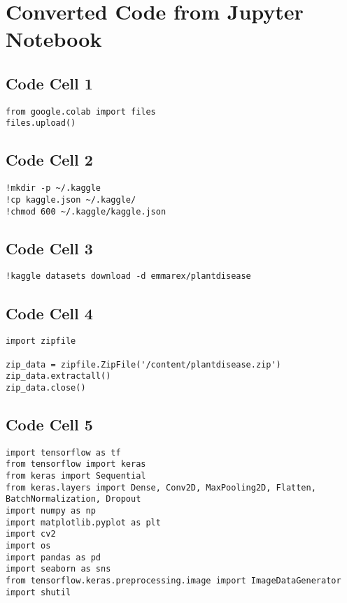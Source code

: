 \documentclass{article}
\begin{document}
\section*{Converted Code from Jupyter Notebook}

\subsection*{Code Cell 1}
\begin{lstlisting}
from google.colab import files
files.upload()
\end{lstlisting}

\subsection*{Code Cell 2}
\begin{lstlisting}
!mkdir -p ~/.kaggle
!cp kaggle.json ~/.kaggle/
!chmod 600 ~/.kaggle/kaggle.json

\end{lstlisting}

\subsection*{Code Cell 3}
\begin{lstlisting}
!kaggle datasets download -d emmarex/plantdisease
\end{lstlisting}

\subsection*{Code Cell 4}
\begin{lstlisting}
import zipfile

zip_data = zipfile.ZipFile('/content/plantdisease.zip')
zip_data.extractall()
zip_data.close()
\end{lstlisting}

\subsection*{Code Cell 5}
\begin{lstlisting}
import tensorflow as tf
from tensorflow import keras
from keras import Sequential
from keras.layers import Dense, Conv2D, MaxPooling2D, Flatten, BatchNormalization, Dropout
import numpy as np
import matplotlib.pyplot as plt
import cv2
import os
import pandas as pd
import seaborn as sns
from tensorflow.keras.preprocessing.image import ImageDataGenerator
import shutil
\end{lstlisting}
\end{document}
